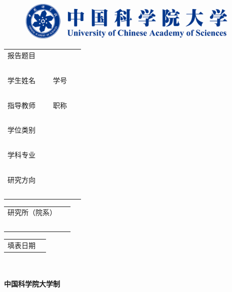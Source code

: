 {\Large\ \par\ \par\ \par}
\begin{figure}[H]
\center
\includegraphics[width=12.81cm]{PICS/UCAS_Logo_Long.png}
\end{figure}
\begin{center}
\noindent\Biaoti\textbf{\reportuse}\par
\vspace{6.5cm}
\xiaosan\bfseries
\begin{tabular}{p{60pt}>{\centering\arraybackslash}p{120pt}>{\centering\arraybackslash}p{30pt}>{\centering\arraybackslash}p{120pt}}
	报告题目&\multicolumn{3}{>{\centering\arraybackslash}p{275pt}}{\reponame}	\\ \cline{2-4}
	\ &\ &\ &\ \\[10pt]
	学生姓名&\authname&学号&\authnumb		\\ \cline{2-2}\cline{4-4}
	\ &\ &\ &\ \\[10pt]
	指导教师&\teacname&职称&\teachrank		\\ \cline{2-2}\cline{4-4}
	\ &\ &\ &\ \\[10pt]
	学位类别&\multicolumn{3}{>{\centering\arraybackslash}p{275pt}}{\studerank}	\\ \cline{2-4}
	\ &\ &\ &\ \\[10pt]
	学科专业&\multicolumn{3}{>{\centering\arraybackslash}p{275pt}}{\majorarea}	\\ \cline{2-4}
	\ &\ &\ &\ \\[10pt]
	研究方向&\multicolumn{3}{>{\centering\arraybackslash}p{275pt}}{\majorproj}	\\ \cline{2-4}
	\ &\ &\ &\ \\[10pt]
\end{tabular}
\begin{tabular}{p{95pt}>{\centering\arraybackslash}p{260pt}}
	研究所（院系）&\instidepar	\\ \cline{2-2}
	\ &\ \\[10pt]
\end{tabular}
\begin{tabular}{p{60pt}>{\centering\arraybackslash}p{295pt}}
	填表日期&\datetable	\\ \cline{2-2}
\end{tabular}\\
\Xiaosan\bfseries
\ \vspace{10pt}\\
中国科学院大学制
\end{center}